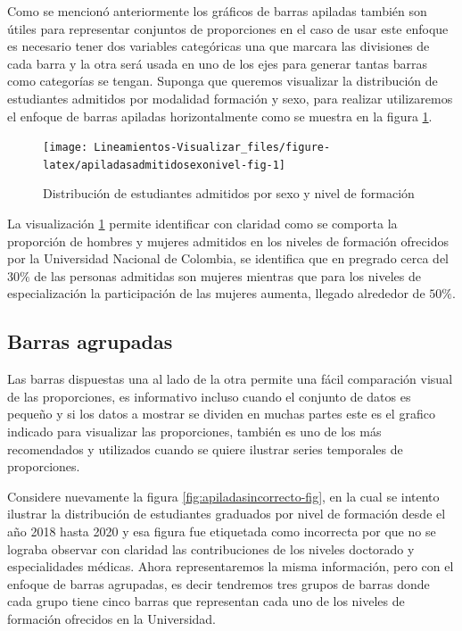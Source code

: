 \documentclass[
]{book}
\begin{document}
Como se mencionó anteriormente los gráficos de barras apiladas también son útiles para representar conjuntos de proporciones en el caso de usar este enfoque es necesario tener dos variables categóricas una que marcara las divisiones de cada barra y la otra será usada en uno de los ejes para generar tantas barras como categorías se tengan. Suponga que queremos visualizar la distribución de estudiantes admitidos por modalidad formación y sexo, para realizar utilizaremos el enfoque de barras apiladas horizontalmente como se muestra en la figura \ref{fig:apiladasadmitidosexonivel-fig}.

\begin{figure}

{\centering \texttt{[image: Lineamientos-Visualizar\_files/figure-latex/apiladasadmitidosexonivel-fig-1]} 

}

\caption{Distribución de estudiantes admitidos por sexo y nivel de formación}\label{fig:apiladasadmitidosexonivel-fig}
\end{figure}

La visualización \ref{fig:apiladasadmitidosexonivel-fig} permite identificar con claridad como se comporta la proporción de hombres y mujeres admitidos en los niveles de formación ofrecidos por la Universidad Nacional de Colombia, se identifica que en pregrado cerca del \(30\%\) de las personas admitidas son mujeres mientras que para los niveles de especialización la participación de las mujeres aumenta, llegado alrededor de \(50\%\).

\hypertarget{barras-agrupadas}{%
\subsection{Barras agrupadas}\label{barras-agrupadas}}

Las barras dispuestas una al lado de la otra permite una fácil comparación visual de las proporciones, es informativo incluso cuando el conjunto de datos es pequeño y si los datos a mostrar se dividen en muchas partes este es el grafico indicado para visualizar las proporciones, también es uno de los más recomendados y utilizados cuando se quiere ilustrar series temporales de proporciones.

Considere nuevamente la figura \ref{fig:apiladasincorrecto-fig}, en la cual se intento ilustrar la distribución de estudiantes graduados por nivel de formación desde el año 2018 hasta 2020 y esa figura fue etiquetada como incorrecta por que no se lograba observar con claridad las contribuciones de los niveles doctorado y especialidades médicas. Ahora representaremos la misma información, pero con el enfoque de barras agrupadas, es decir tendremos tres grupos de barras donde cada grupo tiene cinco barras que representan cada uno de los niveles de formación ofrecidos en la Universidad.
\end{document}
